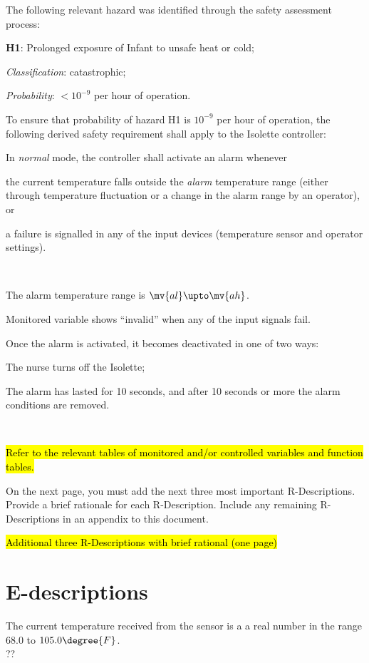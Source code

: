 \documentclass[fontsize=12pt,paper=letter,twoside]{scrartcl}
\begin{document}
The following relevant hazard was identified through the safety assessment process:
\begin{mylist}
\item \textbf{H1}: Prolonged exposure of Infant to unsafe heat or cold;
\item \emph{Classification}: catastrophic;
\item \emph{Probability}: $<10^{-9}$ per hour of operation.
\end{mylist}

\noindent To ensure that probability of hazard H1 is $10^{-9}$ per hour of operation, the following derived safety requirement shall apply to the Isolette controller: 

\rdescription
{In \emph{normal} mode, the controller shall activate an alarm whenever 

\begin{mylist}
\item the current temperature falls outside the \emph{alarm} temperature range (either through temperature fluctuation or a change in the alarm range by an operator), or
\item a failure is signalled in any of the input devices (temperature sensor and operator settings).
\end{mylist}~}
{The alarm temperature range is $\mv{al}\upto\mv{ah}$.

Monitored variable  
shows ``invalid'' when any of the input signals fail.}
\label{R3}


\rdescription
{Once the alarm is activated, it becomes deactivated in one of two ways:
\begin{mylist}
\item The nurse turns off the Isolette;
\item The alarm has lasted for 10 seconds, and after 10 seconds or more the alarm conditions are removed.
\end{mylist}~\\}
{\hl{Refer to the relevant tables of monitored and/or controlled variables and function tables.}}
\label{R4}


On the next page, you must add the next three most important R-Descriptions. Provide a brief rationale for each R-Description. Include any remaining R-Descriptions in an appendix to this document. 

\newpage
\hl{Additional three R-Descriptions with brief rational (one page)}

\newpage
\section{E-descriptions}
\edescription
{The current temperature received from the sensor is a a real number in the range $68.0$ to $105.0 \degree{F}$.\\}
{??}
\label{E1}
\end{document}
